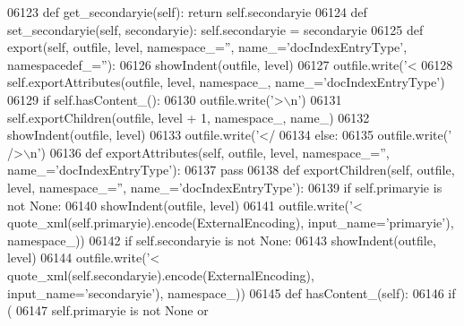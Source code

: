 \begin{DoxyCode}
{{{{{{{{{{{{{{{{{{{{{{{{{{{{{{{{{{{{{{{{{{{{{{{{{{{{{{{{{{{{{{{{{{{{{{{{{{{{{{{{{{{{{{{{{{{{{{{{{{{{{{{{{{{{{{{{{{{{{{{{{{{{{{{{{{{{{{{{{{{{{{{{{{{{{{{{{{{{{{{{{{{{{{{{{{{{{{{{{{{{{{{{{{{{{{{{{{{{{{{{{{{{{{{{{{{{{{{{{{{{{{{{{{{{{{{{{{{{{{{{{{{{{{{{{{{{{{{{{{{{{{{{{{{{{{{{{{{{{{{{{{{{{{{{{{{{{{{{{{{{{{{{{{{{{{{{{{{{{{{{{{{{{{{{{{{{{{{{{{{{{{{{{{{{{{{{{{{{{{{{{{{{{{{{{{{{{{{{{{{{{{06123     \textcolor{keyword}{def }get_secondaryie(self): \textcolor{keywordflow}{return} self.secondaryie
06124     \textcolor{keyword}{def }set_secondaryie(self, secondaryie): self.secondaryie = secondaryie
06125     \textcolor{keyword}{def }export(self, outfile, level, namespace\_='', name\_='docIndexEntryType', namespacedef\_=''):
06126         showIndent(outfile, level)
06127         outfile.write(\textcolor{stringliteral}{'<%
06128         self.exportAttributes(outfile, level, namespace\_, name\_=\textcolor{stringliteral}{'docIndexEntryType'})
06129         \textcolor{keywordflow}{if} self.hasContent_():
06130             outfile.write(\textcolor{stringliteral}{'>\(\backslash\)n'})
06131             self.exportChildren(outfile, level + 1, namespace\_, name\_)
06132             showIndent(outfile, level)
06133             outfile.write(\textcolor{stringliteral}{'</%
06134         \textcolor{keywordflow}{else}:
06135             outfile.write(\textcolor{stringliteral}{' />\(\backslash\)n'})
06136     \textcolor{keyword}{def }exportAttributes(self, outfile, level, namespace\_='', name\_='docIndexEntryType'):
06137         \textcolor{keywordflow}{pass}
06138     \textcolor{keyword}{def }exportChildren(self, outfile, level, namespace\_='', name\_='docIndexEntryType'):
06139         \textcolor{keywordflow}{if} self.primaryie \textcolor{keywordflow}{is} \textcolor{keywordflow}{not} \textcolor{keywordtype}{None}:
06140             showIndent(outfile, level)
06141             outfile.write(\textcolor{stringliteral}{'<%
      quote_xml(self.primaryie).encode(ExternalEncoding), input\_name=\textcolor{stringliteral}{'primaryie'}), namespace\_))
06142         \textcolor{keywordflow}{if} self.secondaryie \textcolor{keywordflow}{is} \textcolor{keywordflow}{not} \textcolor{keywordtype}{None}:
06143             showIndent(outfile, level)
06144             outfile.write(\textcolor{stringliteral}{'<%
      quote_xml(self.secondaryie).encode(ExternalEncoding), input\_name=\textcolor{stringliteral}{'secondaryie'}), namespace\_))
06145     \textcolor{keyword}{def }hasContent_(self):
06146         \textcolor{keywordflow}{if} (
06147             self.primaryie \textcolor{keywordflow}{is} \textcolor{keywordflow}{not} \textcolor{keywordtype}{None} \textcolor{keywordflow}{or}
}}}}}}}}}}}}}}}}}}}}}}}}}}}}}}}}}}}}}}}}}}}}}}}}}}}}}}}}}}}}}}}}}}}}}}}}}}}}}}}}}}}}}}}}}}}}}}}}}}}}}}}}}}}}}}}}}}}}}}}}}}}}}}}}}}}}}}}}}}}}}}}}}}}}}}}}}}}}}}}}}}}}}}}}}}}}}}}}}}}}}}}}}}}}}}}}}}}}}}}}}}}}}}}}}}}}}}}}}}}}}}}}}}}}}}}}}}}}}}}}}}}}}}}}}}}}}}}}}}}}}}}}}}}}}}}}}}}}}}}}}}}}}}}}}}}}}}}}}}}}}}}}}}}}}}}}}}}}}}}}}}}}}}}}}}}}}}}}}}}}}}}}}}}}}}}}}}}}}}}}}}}}}}}}}}}}}}}}}}}}}}}}}}
\end{DoxyCode}
